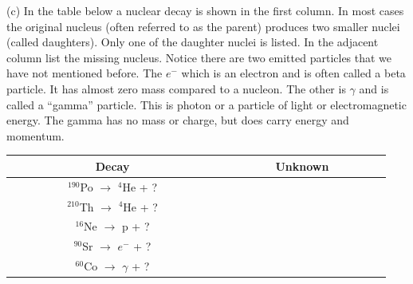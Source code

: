 (c) In the table below a nuclear decay is shown in the first column.
In most cases the original nucleus (often referred to as the parent)
produces two smaller nuclei (called daughters). Only one of the
daughter nuclei is listed. In the adjacent column list the missing
nucleus.
Notice there are two emitted particles that we have not mentioned
before.
The $e^-$ which is an electron and is often called a
beta particle.
It has almost zero mass compared to a nucleon.
The other is $\gamma$ and is called a ``gamma'' particle.
This is photon or a particle of light
or electromagnetic energy.
The gamma has no mass or charge, but does carry energy and momentum.

\vspace{0.3cm}
{\centering \begin{tabular}{|c|c|}
\hline 
~~~~~~~~~~~~~Decay~~~~~~~~~~~~~&
~~~~~~~~Unknown~~~~~~~~\\
\hline
\hline 
\( ^{190} \)Po \( \rightarrow  \) \( ^{4} \)He + ?&
\\
\hline 
\( ^{210} \)Th \( \rightarrow  \) \( ^{4} \)He + ?&
\\
\hline 
\( ^{16} \)Ne \( \rightarrow  \) p + ?&
\\
\hline 
\( ^{90} \)Sr \( \rightarrow  \) \(e^-\) + ?&
\\
\hline 
\( ^{60} \)Co \( \rightarrow  \) \(\gamma\) + ?&
\\
\hline
\end{tabular}\par}
\vspace{0.3cm}



